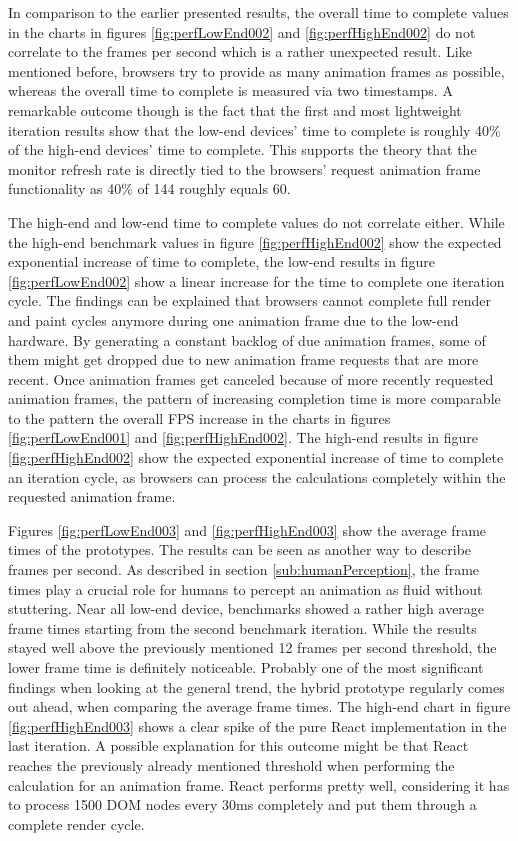 In comparison to the earlier presented results, the overall time to complete values in the charts in figures \ref{fig:perfLowEnd002} and \ref{fig:perfHighEnd002} do not correlate to the frames per second which is a rather unexpected result. Like mentioned before, browsers try to provide as many animation frames as possible, whereas the overall time to complete is measured via two timestamps. A remarkable outcome though is the fact that the first and most lightweight iteration results show that the low-end devices' time to complete is roughly 40\% of the high-end devices' time to complete. This supports the theory that the monitor refresh rate is directly tied to the browsers' request animation frame functionality as 40\% of 144 roughly equals 60. 

The high-end and low-end time to complete values do not correlate either. While the high-end benchmark values in figure \ref{fig:perfHighEnd002} show the expected exponential increase of time to complete, the low-end results in figure \ref{fig:perfLowEnd002} show a linear increase for the time to complete one iteration cycle. The findings can be explained that browsers cannot complete full render and paint cycles anymore during one animation frame due to the low-end hardware. By generating a constant backlog of due animation frames, some of them might get dropped due to new animation frame requests that are more recent. Once animation frames get canceled because of more recently requested animation frames, the pattern of increasing completion time is more comparable to the pattern the overall FPS increase in the charts in figures \ref{fig:perfLowEnd001} and \ref{fig:perfHighEnd002}. The high-end results in figure \ref{fig:perfHighEnd002} show the expected exponential increase of time to complete an iteration cycle, as browsers can process the calculations completely within the requested animation frame.

Figures \ref{fig:perfLowEnd003} and \ref{fig:perfHighEnd003} show the average frame times of the prototypes. The results can be seen as another way to describe frames per second. As described in section \ref{sub:humanPerception}, the frame times play a crucial role for humans to percept an animation as fluid without stuttering. Near all low-end device, benchmarks showed a rather high average frame times starting from the second benchmark iteration. While the results stayed well above the previously mentioned 12 frames per second threshold, the lower frame time is definitely noticeable. Probably one of the most significant findings when looking at the general trend, the hybrid prototype regularly comes out ahead, when comparing the average frame times. The high-end chart in figure \ref{fig:perfHighEnd003} shows a clear spike of the pure React implementation in the last iteration. A possible explanation for this outcome might be that React reaches the previously already mentioned threshold when performing the calculation for an animation frame. React performs pretty well, considering it has to process 1500 DOM nodes every 30ms completely and put them through a complete render cycle.

